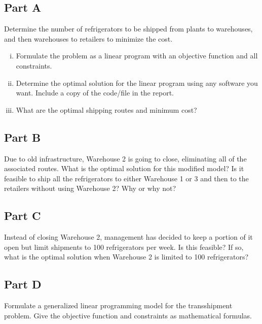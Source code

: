 \documentclass[../main.tex]{subfiles}
\begin{document}
\subsection*{Part A}
Determine the number of refrigerators to be shipped from plants to warehouses, and then warehouses to retailers to minimize the cost.

\begin{enumerate}[i.]
	\item Formulate the problem as a linear program with an objective function and all constraints.

	\item Determine the optimal solution for the linear program using any software you want. Include a copy of the code/file in the report.

	\item What are the optimal shipping routes and minimum cost?
\end{enumerate}

\subsection*{Part B}
Due to old infrastructure, Warehouse 2 is going to close, eliminating all of the associated routes. What is the optimal solution for this modified model? Is it feasible to ship all the refrigerators to either Warehouse 1 or 3 and then to the retailers without using Warehouse 2? Why or why not?

\subsection*{Part C}
Instead of closing Warehouse 2, management has decided to keep a portion of it open but limit shipments to 100 refrigerators per week. Is this feasible? If so, what is the optimal solution when Warehouse 2 is limited to 100 refrigerators?

\subsection*{Part D}
Formulate a generalized linear programming model for the transshipment problem. Give the objective function and constraints as mathematical formulas.
\end{document}
